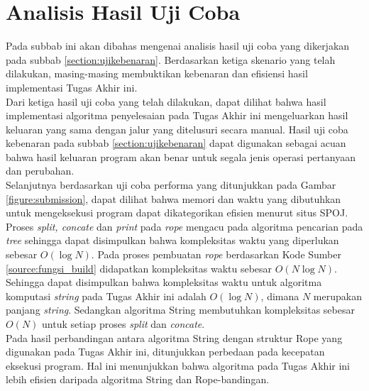 \section{Analisis Hasil Uji Coba}
Pada subbab ini akan dibahas mengenai analisis hasil uji coba yang dikerjakan pada subbab \ref{section:ujikebenaran}. Berdasarkan ketiga skenario yang telah dilakukan, masing-masing membuktikan kebenaran dan efisiensi hasil implementasi Tugas Akhir ini.\\
Dari ketiga hasil uji coba yang telah dilakukan, dapat dilihat bahwa hasil implementasi algoritma penyelesaian \problem{} pada Tugas Akhir ini mengeluarkan hasil keluaran yang sama dengan jalur yang ditelusuri secara manual. Hasil uji coba kebenaran pada subbab \ref{section:ujikebenaran} dapat digunakan sebagai acuan bahwa hasil keluaran program akan benar untuk segala jenis operasi pertanyaan dan perubahan.\\
Selanjutnya berdasarkan uji coba performa yang ditunjukkan pada Gambar \ref{figure:submission}, dapat dilihat bahwa memori dan waktu yang dibutuhkan untuk mengeksekusi program dapat dikategorikan efisien menurut situs SPOJ.\\
Proses \textit{split, concate} dan \textit{print} pada \textit{rope} mengacu pada algoritma pencarian pada \textit{tree} sehingga dapat disimpulkan bahwa kompleksitas waktu yang diperlukan sebesar $O(\log N)$. Pada proses pembuatan \textit{rope} berdasarkan Kode Sumber \ref{source:fungsi_build} didapatkan kompleksitas waktu sebesar $O(N \log N)$. Sehingga dapat disimpulkan bahwa kompleksitas waktu untuk algoritma komputasi \textit{string} pada Tugas Akhir ini adalah $O(\log N)$, dimana $N$ merupakan panjang \textit{string}. Sedangkan algoritma String membutuhkan kompleksitas sebesar $O(N)$ untuk setiap proses \textit{split} dan \textit{concate}\cite{string}.\\
Pada hasil perbandingan antara algoritma String dengan struktur Rope yang digunakan pada Tugas Akhir ini, ditunjukkan perbedaan pada kecepatan eksekusi program. Hal ini menunjukkan bahwa algoritma pada Tugas Akhir ini lebih efisien daripada algoritma String dan Rope-bandingan.